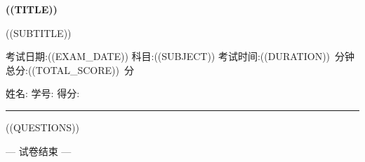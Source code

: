 \documentclass[12pt, a4paper, fontset=none]{ctexart}
\begin{document}
\begin{center}
  {\huge\bfseries ((TITLE))\par}
  \vspace{0.6em}
  {\large ((SUBTITLE))\par}
\end{center}

\vspace{0.4em}

\begin{center}
  考试日期:((EXAM_DATE)) \qquad 科目:((SUBJECT)) \qquad
  考试时间:((DURATION))~分钟 \qquad 总分:((TOTAL_SCORE))~分
\end{center}

\vspace{0.4em}
\noindent 姓名:\underline{\hspace{7em}} \hfill 学号:\underline{\hspace{7em}} \hfill 得分:\underline{\hspace{5em}}
\vspace{0.8em}

\noindent{}

\vspace{1em}
\noindent\rule{\linewidth}{0.8pt}

((QUESTIONS))

\vspace{2em}
\begin{center}
  {\small --- 试卷结束 ---}
\end{center}
\end{document}
